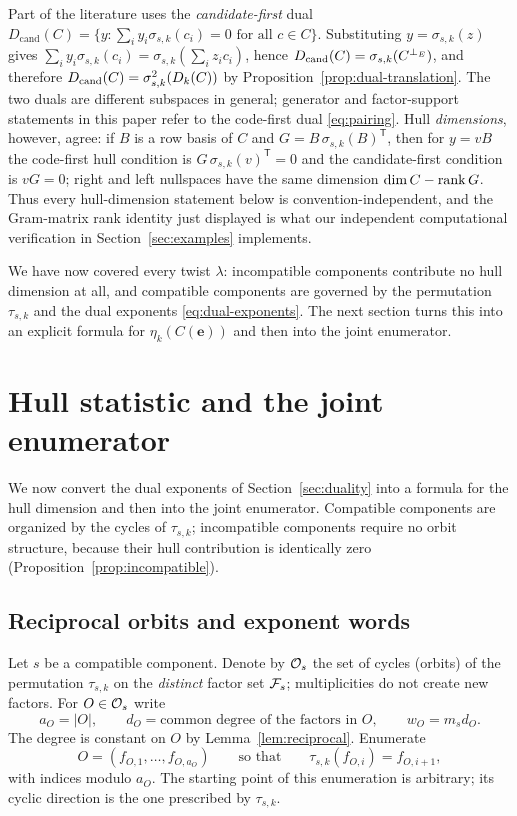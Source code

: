 \begin{remark}\label{rem:candidate}
Part of the literature uses the \emph{candidate-first} dual
$D_{\mathrm{cand}}(C)=\{y:\sum_i y_i\sigma_{s,k}(c_i)=0\text{ for all }c\in C\}$.
Substituting $y=\sigma_{s,k}(z)$ gives
$\sum_i y_i\sigma_{s,k}(c_i)=\sigma_{s,k}(\sum_i z_ic_i)$, hence
$D_{\mathrm{cand}}(C)=\sigma_{s,k}(C^{\perp_{E}})$, and therefore
$D_{\mathrm{cand}}(C)=\sigma_{s,k}^2(D_k(C))$ by
Proposition~\ref{prop:dual-translation}.  The two duals are different subspaces
in general; generator and factor-support statements in this paper refer to the
code-first dual \eqref{eq:pairing}.  Hull \emph{dimensions}, however, agree:
if $B$ is a row basis of $C$ and $G=B\,\sigma_{s,k}(B)^{\mathsf T}$, then for
$y=vB$ the code-first hull condition is $G\,\sigma_{s,k}(v)^{\mathsf T}=0$ and
the candidate-first condition is $vG=0$; right and left nullspaces have the
same dimension $\dim C-\operatorname{rank} G$.  Thus every hull-dimension statement below is
convention-independent, and the Gram-matrix rank identity just displayed is
what our independent computational verification in
Section~\ref{sec:examples} implements.
\end{remark}

We have now covered every twist $\lambda$: incompatible components contribute
no hull dimension at all, and compatible components are governed by the
permutation $\tau_{s,k}$ and the dual exponents
\eqref{eq:dual-exponents}.  The next section turns this into an explicit
formula for $\eta_k(C(\mathbf{e}))$ and then into the joint enumerator.

\section{Hull statistic and the joint enumerator}\label{sec:enumerator}

We now convert the dual exponents of Section~\ref{sec:duality} into a formula
for the hull dimension and then into the joint enumerator.  Compatible
components are organized by the cycles of $\tau_{s,k}$; incompatible components
require no orbit structure, because their hull contribution is identically zero
(Proposition~\ref{prop:incompatible}).

\subsection{Reciprocal orbits and exponent words}\label{sec:orbits}

Let $s$ be a compatible component.  Denote by $\mathcal O_s$ the set of cycles
(orbits) of the permutation $\tau_{s,k}$ on the \emph{distinct} factor set
$\mathcal F_s$; multiplicities do not create new factors.  For $O\in\mathcal O_s$ write
\[
a_O=|O|,\qquad d_O=\text{common degree of the factors in }O,\qquad
w_O=m_sd_O .
\]
The degree is constant on $O$ by Lemma~\ref{lem:reciprocal}.  Enumerate
\[
O=(f_{O,1},\ldots,f_{O,a_O})
\qquad\text{so that}\qquad
\tau_{s,k}(f_{O,i})=f_{O,i+1},
\]
with indices modulo $a_O$.  The starting point of this enumeration is arbitrary;
its cyclic direction is the one prescribed by $\tau_{s,k}$.

